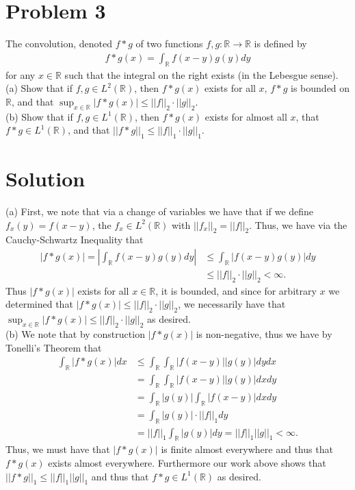 \documentclass{article}
\begin{document}
\section*{Problem 3}
The convolution, denoted $f*g$ of two functions $f,g:\mathbb{R}\rightarrow\mathbb{R}$ is defined by
\begin{align*}
f*g(x)=\int_\mathbb{R}f(x-y)g(y)dy
\end{align*}
for any $x\in\mathbb{R}$ such that the integral on the right exists (in the Lebesgue sense).\\

\noindent (a) Show that if $f,g\in L^2(\mathbb{R})$, then $f*g(x)$ exists for all $x$, $f*g$ is bounded on $\mathbb{R}$, and that $\sup_{x\in\mathbb{R}}|f*g(x)|\leq||f||_2\cdot||g||_2$.\\

\noindent (b) Show that if $f,g\in L^1(\mathbb{R})$, then $f*g(x)$ exists for almost all $x$, that $f*g\in L^1(\mathbb{R})$, and that $||f*g||_1\leq ||f||_1\cdot||g||_1$.

\section*{Solution}
(a) First, we note that via a change of variables we have that if we define $f_x(y)=f(x-y)$, the $f_x\in L^2(\mathbb{R})$ with $||f_x||_2=||f||_2$.  Thus, we have via the Cauchy-Schwartz Inequality that
\begin{align*}
|f*g(x)|=\left|\int_\mathbb{R}f(x-y)g(y)dy\right|&\leq\int_\mathbb{R}|f(x-y)g(y)|dy\\
&\leq ||f||_2\cdot||g||_2<\infty.
\end{align*}
Thus $|f*g(x)|$ exists for all $x\in\mathbb{R}$, it is bounded, and since for arbitrary $x$ we determined that $|f*g(x)|\leq||f||_2\cdot||g||_2$, we necessarily have that $\sup_{x\in\mathbb{R}}|f*g(x)|\leq||f||_2\cdot||g||_2$ as desired.\\

\noindent (b) We note that by construction $|f*g(x)|$ is non-negative, thus we have by Tonelli's Theorem that
\begin{align*}
\int_\mathbb{R}|f*g(x)|dx&\leq\int_\mathbb{R}\int_\mathbb{R}|f(x-y)||g(y)|dydx\\
&=\int_\mathbb{R}\int_\mathbb{R}|f(x-y)||g(y)|dxdy\\
&=\int_\mathbb{R}|g(y)|\int_\mathbb{R}|f(x-y)|dxdy\\
&=\int_\mathbb{R}|g(y)|\cdot||f||_1dy\\
&=||f||_1\int_\mathbb{R}|g(y)|dy=||f||_1||g||_1<\infty.
\end{align*}
Thus, we must have that $|f*g(x)|$ is finite almost everywhere and thus that $f*g(x)$ exists almost everywhere.  Furthermore our work above shows that $||f*g||_1\leq||f||_1||g||_1$ and thus that $f*g\in L^1(\mathbb{R})$ as desired.
\end{document}
